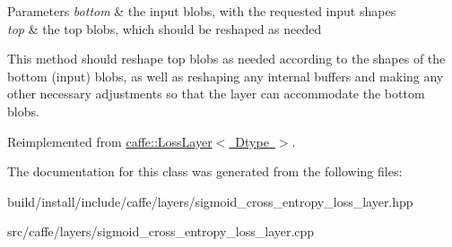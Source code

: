 \begin{DoxyParams}{Parameters}
{\em bottom} & the input blobs, with the requested input shapes \\
\hline
{\em top} & the top blobs, which should be reshaped as needed\\
\hline
\end{DoxyParams}
This method should reshape top blobs as needed according to the shapes of the bottom (input) blobs, as well as reshaping any internal buffers and making any other necessary adjustments so that the layer can accommodate the bottom blobs. 

Reimplemented from \mbox{\hyperlink{classcaffe_1_1_loss_layer_abf00412194f5413ea9468ee44b0d986f}{caffe\+::\+Loss\+Layer$<$ Dtype $>$}}.



The documentation for this class was generated from the following files\+:\begin{DoxyCompactItemize}
\item 
build/install/include/caffe/layers/sigmoid\+\_\+cross\+\_\+entropy\+\_\+loss\+\_\+layer.\+hpp\item 
src/caffe/layers/sigmoid\+\_\+cross\+\_\+entropy\+\_\+loss\+\_\+layer.\+cpp\end{DoxyCompactItemize}
